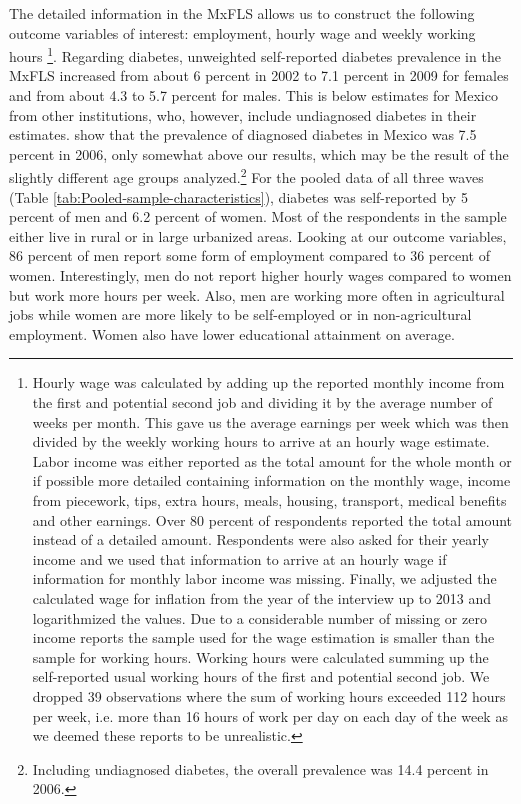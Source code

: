 \documentclass[12pt,english,british]{article}
\begin{document}
The detailed information in the \ac{MxFLS} allows us to construct the following outcome variables of interest: employment, hourly wage and weekly working hours \footnote{Hourly wage was calculated by adding up the reported monthly income from the first and potential second job and dividing it by the average number of weeks per month. This gave us the average earnings per week which was then divided by the weekly working hours to arrive at an hourly wage estimate. Labor income was either reported as the total amount for the whole month or if possible more detailed containing information on the monthly wage, income from piecework, tips, extra hours, meals, housing, transport, medical benefits and other earnings. Over 80 percent of respondents reported the total amount instead of a detailed amount. Respondents were also asked for their yearly income and we used that information to arrive at an hourly wage if information for monthly labor income was missing. Finally, we adjusted the calculated wage for inflation from the year of the interview up to 2013 and logarithmized the  values. Due to a considerable number of missing or zero income reports the sample used for the wage estimation is smaller than the sample for working hours. Working hours were calculated summing up the self-reported usual working hours of the first and potential second job. We dropped 39 observations where the sum of working hours exceeded 112 hours per week, i.e. more than 16 hours of work per day on each day of the week as we deemed these reports to be unrealistic.}. Regarding diabetes, unweighted self-reported diabetes prevalence in the \ac{MxFLS} increased from about 6 percent in 2002 to 7.1 percent in 2009 for females and from about 4.3 to 5.7 percent for males. This is below estimates for Mexico from other institutions, who, however, include undiagnosed diabetes in their estimates. \citet{Barquera2013} show that the prevalence of diagnosed diabetes in Mexico was 7.5 percent in 2006, only somewhat above our results, which may be the result of the slightly different age groups analyzed.\footnote{Including undiagnosed diabetes, the overall prevalence was 14.4 percent in 2006.}  For the pooled data of all three waves (Table  \ref{tab:Pooled-sample-characteristics}),
diabetes was self-reported by 5 percent of men and 6.2 percent of
women. Most of the respondents in the sample either live in rural
or in large urbanized areas. Looking at our outcome variables, 86
percent of men report some form of employment compared to 36 percent
of women. Interestingly, men do not report higher hourly wages compared
to women but work more hours per week. Also, men are working more
often in agricultural jobs while women are more likely to be self-employed
or in non-agricultural employment. Women also have lower educational
attainment on average. 
\end{document}

